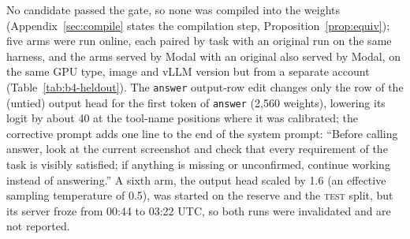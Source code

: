 No candidate passed the gate, so none was compiled into the weights (Appendix~\ref{sec:compile} states the compilation step, Proposition~\ref{prop:equiv}); five arms were run online, each paired by task with an original run on the same harness, and the arms served by Modal with an original also served by Modal, on the same GPU type, image and vLLM version but from a separate account (Table~\ref{tab:b4-heldout}). The \texttt{answer} output-row edit changes only the row of the (untied) output head for the first token of \texttt{answer} (2{,}560 weights), lowering its logit by about 40 at the tool-name positions where it was calibrated; the corrective prompt adds one line to the end of the system prompt: ``Before calling answer, look at the current screenshot and check that every requirement of the task is visibly satisfied; if anything is missing or unconfirmed, continue working instead of answering.'' A sixth arm, the output head scaled by 1.6 (an effective sampling temperature of 0.5), was started on the reserve and the \textsc{test} split, but its server froze from 00:44 to 03:22 UTC, so both runs were invalidated and are not reported. %

